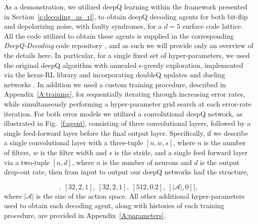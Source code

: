 \documentclass[twocolumn,preprintnumbers,amsmath,amssymb,notitlepage,nofootinbib,longbibliography,superscriptaddress,aps,pra,10pt]{revtex4-1}
\begin{document}
	As a demonstration, we utilized deepQ learning within the framework presented in Section~\ref{s:decoding_as_rl}, to obtain deepQ decoding agents for both bit-flip and
	depolarizing noise, with faulty syndromes, for a $d=5$ surface code lattice.
	All the code utilized to obtain these agents is supplied in the corresponding \textit{DeepQ-Decoding} code repository \cite{DeepQDecoding}, and as such we will
	provide only an overview of the details here.
	In particular, for a single fixed set of hyper-parameters, we used the original deepQ algorithm \cite{RLMnih15}with annealed $\epsilon$-greedy
	exploration, implemented via the keras-RL library \cite{plappert2016kerasrl} and incorporating doubleQ updates \cite{RLvan2016deep} and dueling
	networks \cite{RLwang2015dueling}.
	In addition we used a custom training procedure, described in Appendix~\ref{A:training}, for sequentially iterating through increasing error rates, while
	simultaneously performing a hyper-parameter grid search at each error-rate iteration.
	For both error models we utilized a convolutional deepQ network, as illustrated in Fig.~\ref{f:agent}, consisting of three convolutional layers, followed by a
	single feed-forward layer before the final output layer.
	Specifically, if we describe a single convolutional layer with a three-tuple $[n,w,s]$, where $n$ is the number of filters, $w$ is the filter width and $s$ is
	the stride, and a single feed forward layer via a two-tuple $[n,d]$, where $n$ is the number of neurons and $d$ is the output drop-out rate, then from
	input to output our deepQ networks had the structure,

	\begin{equation}
		[[64,3,2],~[32,2,1],~[32,2,1],~[512,0.2],~[|\mathcal{A}|, 0]],
	\end{equation}
	where $|\mathcal{A}|$ is the size of the action space.
	All other additional hyper-parameters used to obtain each decoding agent, along with histories of each training procedure, are provided in Appendix~\ref{A:parameters}.
\end{document}
